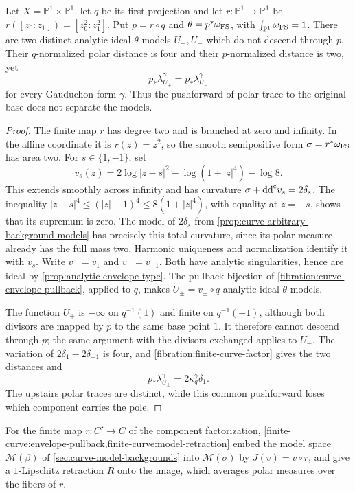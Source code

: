 \begin{example}\label{fibration:disconnected-polar-pushforward}
Let $X=\mathbb P^1\times\mathbb P^1$, let $q$ be its first
projection and let $r\colon\mathbb P^1\to\mathbb P^1$ be
$r([z_0:z_1])=[z_0^2:z_1^2]$. Put $p=r\circ q$ and
$\theta=p^*\omega_{\mathrm{FS}}$, with $\int_{\mathbb P^1}\omega_{\mathrm{FS}}=1$.
There are two distinct analytic ideal $\theta$-models $U_+,U_-$
which do not descend through $p$. Their $q$-normalized polar
distance is four and their $p$-normalized distance is two, yet
\[
 p_*\lambda_{U_+}^\gamma=p_*\lambda_{U_-}^\gamma
\]
for every Gauduchon form $\gamma$. Thus the pushforward of polar
trace to the original base does not separate the models.
\end{example}
\begin{proof}
The finite map $r$ has degree two and is branched at zero and
infinity. In the affine coordinate it is $r(z)=z^2$, so the
smooth semipositive form $\sigma=r^*\omega_{\mathrm{FS}}$ has area two.
For $s\in\{1,-1\}$, set
\[
 v_s(z)=2\log|z-s|^2-\log(1+|z|^4)-\log8.
\]
This extends smoothly across infinity and has curvature
$\sigma+\mathrm{dd}^{\mathrm{c}} v_s=2\delta_s$. The inequality
$|z-s|^4\leq(|z|+1)^4\leq8(1+|z|^4)$, with equality at
$z=-s$, shows that its supremum is zero.
The model of $2\delta_s$ from
\cref{prop:curve-arbitrary-background-models} has precisely
this total curvature, since its polar measure already has the
full mass two. Harmonic uniqueness and normalization identify
it with $v_s$. Write $v_+=v_1$ and $v_-=v_{-1}$. Both have
analytic singularities, hence are ideal by
\cref{prop:analytic-envelope-type}. The pullback bijection of
\cref{fibration:curve-envelope-pullback}, applied to $q$, makes
$U_\pm=v_\pm\circ q$ analytic ideal $\theta$-models.

The function $U_+$ is $-\infty$ on $q^{-1}(1)$ and finite on
$q^{-1}(-1)$, although both divisors are mapped by $p$ to the
same base point $1$. It therefore cannot descend through $p$;
the same argument with the divisors exchanged applies to $U_-$.
The variation of $2\delta_1-2\delta_{-1}$ is four, and
\cref{fibration:finite-curve-factor} gives the two distances and
\[
 p_*\lambda_{U_\pm}^\gamma
   =2\kappa_q^\gamma\delta_1.
\]
The upstairs polar traces are distinct, while this common
pushforward loses which component carries the pole.
\end{proof}

For the finite map $r\colon C'\to C$ of the component
factorization,
\cref{finite-curve:envelope-pullback,finite-curve:model-retraction}
embed the model space $\mathcal M(\beta)$ of
\cref{sec:curve-model-backgrounds} into $\mathcal M(\sigma)$ by
$J(v)=v\circ r$, and give a $1$-Lipschitz retraction $R$ onto the
image, which averages polar measures over the fibers of $r$.

